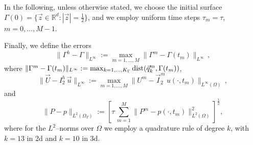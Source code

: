 \documentclass[a4paper,11pt,onecolumn]{article}
\newcommand{\R}{{\mathbb R}}
\newcommand{\errorXx}{\|\Gamma^h - \Gamma\|_{L^\infty}}
\newcommand{\errorUu}[1]{\|\vec U - I^h_{#1}\,\vec u\|_{L^\infty}}
\newcommand{\LerrorPp}{\|P - p\|_{L^2(\Omega_T)}}
\begin{document}
In the following, unless otherwise stated, we choose the initial surface
$\Gamma(0) = \{ \vec z \in \R^d : |\vec z| = \frac12 \}$, and we employ
uniform time steps $\tau_m=\tau$, $m=0,\ldots, M-1$.

Finally, we define the errors
\begin{equation} \label{eq:errorXx}
\errorXx := \max_{m=1,\ldots, M} \|\Gamma^m - \Gamma(t_m)\|_{L^\infty}\,,
\end{equation}
where $\|\Gamma^m - \Gamma(t_m)\|_{L^\infty} :=
\max_{k=1,\ldots, K_\Gamma} {\rm dist}( \vec{q}^m_k, \Gamma(t_m))$,
\begin{equation*}
\errorUu2 := \max_{m=1,\ldots, M}\|U^m
- \vec I^m_2\,u(\cdot,t_m)\|_{L^\infty(\Omega)}\,,
\end{equation*}
and
\begin{equation*}
\LerrorPp := \left[\tau\,\sum_{m=1}^M \|P^m - p(\cdot,t_m)\|_{L^2(\Omega)}^2
\right]^\frac12 ,
\end{equation*}
where for the $L^2$--norms over $\Omega$ we employ a quadrature rule of degree
$k$, with $k=13$ in 2d and $k=10$ in 3d.
\end{document}
